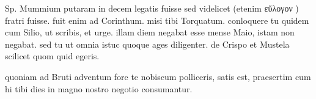 


 Sp. Mummium putaram in decem legatis fuisse sed videlicet (etenim εὔλογον ) fratri fuisse. fuit enim ad Corinthum. misi tibi Torquatum. conloquere tu quidem cum Silio, ut scribis, et urge. illam diem negabat esse mense Maio, istam non negabat. sed tu ut omnia istuc quoque ages diligenter. de Crispo et Mustela scilicet quom quid egeris.

 quoniam ad Bruti adventum fore te nobiscum polliceris, satis est, praesertim cum hi tibi dies in magno nostro negotio consumantur.

